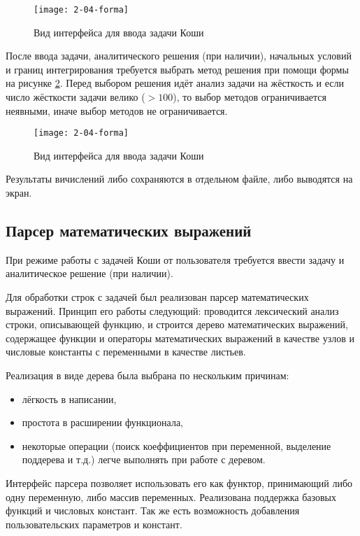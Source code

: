 \begin{figure}
    \texttt{[image: 2-04-forma]}
    \caption{Вид интерфейса для ввода задачи Коши}
    \label{fig:forma1}
\end{figure}

После ввода задачи, аналитического решения (при наличии), начальных условий и границ интегрирования требуется выбрать метод решения
при помощи формы на рисунке \ref{fig:forma2}.
Перед выбором решения идёт анализ задачи на жёсткость и если число жёсткости задачи велико ($> 100$), то выбор методов ограничивается
неявными, иначе выбор методов не ограничивается.

\begin{figure}
    \texttt{[image: 2-04-forma]}
    \caption{Вид интерфейса для ввода задачи Коши}
    \label{fig:forma2}
\end{figure}

Результаты вичислений либо сохраняются в отдельном файле, либо выводятся на экран.

\subsection{Парсер математических выражений}

При режиме работы с задачей Коши от пользователя требуется ввести задачу и аналитическое решение (при наличии). 

Для обработки строк с задачей был реализован парсер математических выражений. Принцип его работы следующий: проводится лексический
анализ строки, описывающей функцию, и строится дерево
математических выражений, содержащее функции и операторы математических выражений в качестве узлов
и числовые константы с переменными в качестве листьев.

Реализация в виде дерева была выбрана по нескольким причинам:

\begin{itemize}
    \item лёгкость в написании,
    \item простота в расширении функционала,
    \item некоторые операции (поиск коеффициентов при переменной, выделение поддерева и т.д.) легче выполнять при работе с деревом.
\end{itemize}

Интерфейс парсера позволяет использовать его как функтор, принимающий либо одну переменную, либо массив переменных. Реализована поддержка
базовых функций и числовых констант. Так же есть возможность добавления пользовательских параметров и констант.

